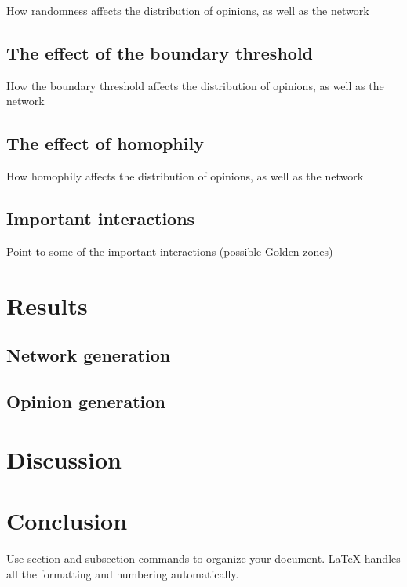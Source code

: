 \documentclass[9pt,twocolumn,twoside]{ilcss}
\begin{document}
How randomness affects the distribution of opinions, as well as the network

\subsection{The effect of the boundary threshold}

How the boundary threshold affects the distribution of opinions, as well as the network

\subsection{The effect of homophily}

How homophily affects the distribution of opinions, as well as the network

\subsection{Important interactions}

Point to some of the important interactions (possible Golden zones)

\section{Results}

\subsection{Network generation}

\subsection{Opinion generation}

\section{Discussion}

\section{Conclusion}







Use section and subsection commands to organize your document. \LaTeX{} handles all the formatting and numbering automatically. 
\end{document}
